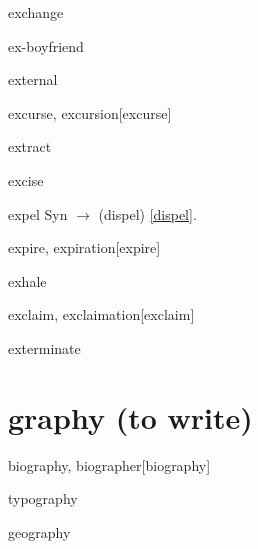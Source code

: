 \begin{RefWord}{exchange}
\end{RefWord}

\begin{RefWord}{ex-boyfriend}
\end{RefWord}

\begin{RefWord}{external}
\end{RefWord}

\begin{RefWord}{excurse, excursion}[excurse]
\end{RefWord}

\begin{RefWord}{extract}
\end{RefWord}

\begin{RefWord}{excise}
\end{RefWord}

\begin{RefWord}{expel}
    Syn $\rightarrow$ (dispel) \ref{dispel}.
\end{RefWord}

\begin{RefWord}{expire, expiration}[expire]
\end{RefWord}

\begin{RefWord}{exhale}
\end{RefWord}

\begin{RefWord}{exclaim, exclaimation}[exclaim]
\end{RefWord}

\begin{RefWord}{exterminate}
\end{RefWord}

\section{graphy (to write)}

\begin{RefWord}{biography, biographer}[biography]
\end{RefWord}

\begin{RefWord}{typography}
\end{RefWord}

\begin{RefWord}{geography}
\end{RefWord}

